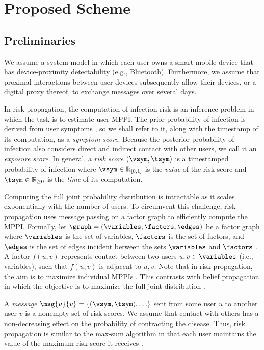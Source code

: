 \chapter{Proposed Scheme}\label{sec:risk-prop}

\section{Preliminaries}

\par We assume a system model in which each user owns a smart mobile device that has device-proximity detectability (e.g., Bluetooth). Furthermore, we assume that proximal interactions between user devices subsequently allow their devices, or a digital proxy thereof, to exchange messages over several days.

\par In risk propagation, the computation of infection risk is an inference problem in which the task is to estimate user MPPI. The prior probability of infection is derived from user symptoms \cite{Menni2020}, so we shall refer to it, along with the timestamp of its computation, as a \emph{symptom score}. Because the posterior probability of infection also considers direct and indirect contact with other users, we call it an \emph{exposure score}. In general, a \emph{risk score} $(\vsym, \tsym)$ is a timestamped probability of infection where $\vsym \in \mathbb{R}_{[0, 1]}$ is the \emph{value} of the risk score and $\tsym \in \mathbb{R}_{\geq 0}$ is the \emph{time} of its computation.

\par Computing the full joint probability distribution is intractable as it scales exponentially with the number of users. To circumvent this challenge, risk propagation uses message passing on a factor graph to efficiently compute the MPPI. Formally, let $\graph = (\variables, \factors, \edges)$ be a factor graph where $\variables$ is the set of variables, $\factors$ is the set of factors, and $\edges$ is the set of edges incident between the sets $\variables$ and $\factors$ \cite{Kschischang2001}. A factor $f(u, v)$ represents contact between two users $u, v \in \variables$ (i.e., variables), such that $f(u, v)$ is adjacent to $u, v$. Note that in risk propagation, the aim is to maximize individual MPPIs \cite{Ayday2021}. This contrasts with belief propagation in which the objective is to maximize the full joint distribution \cite{Bishop2006}.

\par A \emph{message} $\msg{u}{v} = \{(\vsym, \tsym),\ldots\}$ sent from some user $u$ to another user $v$ is a nonempty set of risk scores. We assume that contact with others has a non-decreasing effect on the probability of contracting the disease. Thus, risk propagation is similar to the max-sum algorithm in that each user maintains the value of the maximum risk score it receives \cite{Bishop2006}. 

